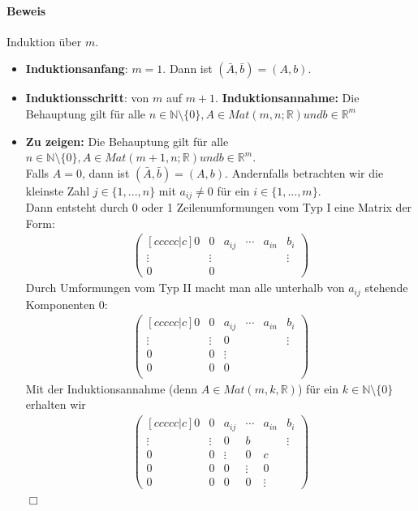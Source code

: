 \documentclass[11pt]{report}
\newcommand*\Zb[1] {\mathbb{#1}}
\newcommand*\f[1] {\textbf{#1}}
\begin{document}
\paragraph{Beweis} Induktion über $m$.
\begin{itemize}
 \item \f{Induktionsanfang}: $m=1$. Dann ist $(\bar{A}, \bar{b})=(A, b)$.
 \item \f{Induktionsschritt}: von $m$ auf $m+1$. \f{Induktionsannahme:} Die Behauptung gilt für alle $n \in \Zb{N}\setminus\{0\}, A \in Mat(m, n; \Zb{R}) und b \in \Zb{R}^m$
 \item \f{Zu zeigen:} Die Behauptung gilt für alle $n \in \Zb{N}\setminus\{0\}, A \in Mat(m+1, n; \Zb{R}) und b \in \Zb{R}^m$. \\
  Falls $A=0$, dann ist $(\bar{A}, \bar{b})=(A, b)$. Andernfalls betrachten wir die kleinste Zahl $j \in \{1, ..., n\}$ mit $a_{ij} \neq 0$ für ein $i \in \{1, ..., m\}$. \\
  Dann entsteht durch 0 oder 1 Zeilenumformungen vom Typ I eine Matrix der Form:
\begin{align}
 \begin{pmatrix}[ccccc|c]
  0 & 0 & a_{ij} & \cdots & a_{in} & b_i \\
  \vdots & \vdots & & & & \vdots \\
  0 & 0 & & & &
 \end{pmatrix}
\end{align}
Durch Umformungen vom Typ II macht man alle unterhalb von $a_{ij}$ stehende Komponenten 0:
\begin{align}
 \begin{pmatrix}[ccccc|c]
  0 & 0 & a_{ij} & \cdots & a_{in} & b_i \\
  \vdots & \vdots & 0 & & & \vdots \\
  0 & 0 & \vdots & & & \\
  0 & 0 & 0 & & & \\
 \end{pmatrix}
\end{align}
Mit der Induktionsannahme (denn $A \in Mat(m, k, \Zb{R})$) für ein $k \in \Zb{N}\setminus\{0\}$ erhalten wir
\begin{align}
 \begin{pmatrix}[ccccc|c]
  0 & 0 & a_{ij} & \cdots & a_{in} & b_i \\
  \vdots & \vdots & 0 & b & & \vdots \\
  0 & 0 & \vdots & 0 & c & \\
  0 & 0 & 0 & \vdots & 0 & \\
  0 & 0 & 0 & 0 & \vdots &
 \end{pmatrix}
\end{align} \hfill $\Box$
\end{itemize}
\end{document}
